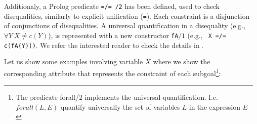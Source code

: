\documentclass{tlp}
\begin{document}







Additionaly, a Prolog predicate {\tt =/= /2} has been defined, used to
check disequalities, similarly to explicit unification ({\tt =}). Each
constraint is a disjunction of conjunctions of disequalities. A
universal quantification in a disequality (e.g., $\forall Y~ X \neq
c(Y)$), is represented with a new constructor {\tt fA}$/1$ (e.g., {\tt
X =/= c(fA(Y)))}.  We refer the interested
reader to check the details in \cite{SusanaPADL2000}.


Let us show some examples involving variable $X$ where we show the
corresponding attribute that represents the constraint of each
subgoal\footnote{The predicate forall/2 implements the universal
quantification. I.e. $forall(L,E)$ quantify universally the set of variables
$L$ in the expression $E$}: 
\end{document}
